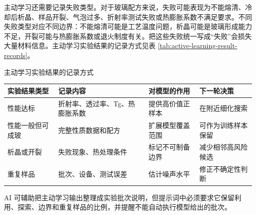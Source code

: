 主动学习还需要记录失败类型。对于玻璃配方来说，失败可能表现为不能熔清、冷却后析晶、样品开裂、气泡过多、折射率测试失败或热膨胀系数不满足要求。不同失败类型对应不同边界：不能熔清可能是工艺温度问题，析晶可能是玻璃形成能力不足，开裂可能与热膨胀系数或退火制度有关。把这些失败统一写成“失败”会损失大量材料信息。主动学习实验结果的记录方式见表 \ref{tab:active-learning-result-records}。

\begin{formalTable}[htbp]
\caption{主动学习实验结果的记录方式}
\label{tab:active-learning-result-records}
\footnotesize
\begin{tabularx}{\textwidth}{@{}YYYY@{}}
\toprule
\textbf{实验结果类型} & \textbf{记录内容} & \textbf{对模型的作用} & \textbf{下一轮决策} \\
\midrule
性能达标 & 折射率、透过率、Tg、热膨胀系数 & 提供高价值正样本 & 在附近细化搜索 \\
性能一般但可成玻 & 完整性质数据和配方 & 扩展模型覆盖范围 & 可作为训练样本保留 \\
析晶或开裂 & 失败现象、热处理条件 & 标记不可制备边界 & 减少相邻高风险候选 \\
重复样品 & 批次、设备、测试误差 & 估计噪声水平 & 修正不确定性判断 \\
\bottomrule
\end{tabularx}
\end{formalTable}

AI 可辅助把主动学习输出整理成实验批次说明，但提示词中必须要求它保留利用、探索、边界和重复样品的比例，并提醒不能自动执行模型给出的批次。

